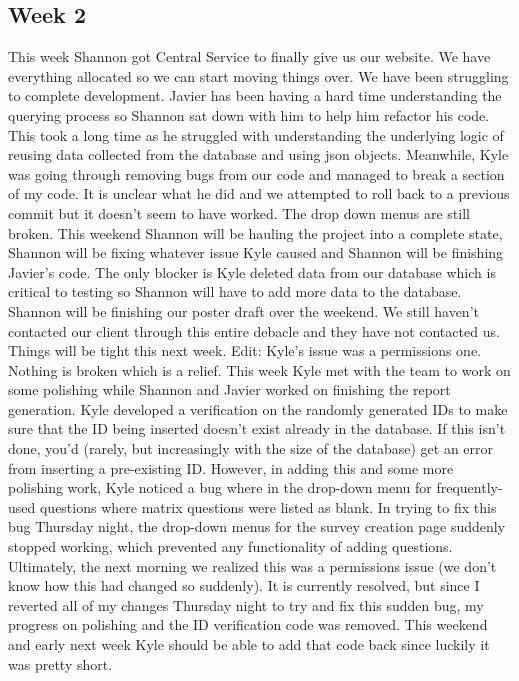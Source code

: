 \documentclass[letterpaper,10pt,serif,draftclsnofoot,onecolumn,compsoc,titlepage]{IEEEtran}
\begin{document}
\subsection{Week 2}
This week Shannon got Central Service to finally give us our website. We have everything
 allocated so we can start moving things over. We have been struggling to complete development.
 Javier has been having a hard time understanding the querying process so Shannon sat down with
 him to help him refactor his code. This took a long time as he struggled with understanding the
 underlying logic of reusing data collected from the database and using json objects. Meanwhile, Kyle
 was going through removing bugs from our code and managed to break a section of my code. It is unclear
 what he did and we attempted to roll back to a previous commit but it doesn't seem to have worked.
 The drop down menus are still broken. This weekend Shannon will be hauling the project into a complete state,
 Shannon will be fixing whatever issue Kyle caused and Shannon will be finishing Javier's code.
 The only blocker is Kyle deleted data from our database which is critical to testing so Shannon will
 have to add more data to the database. Shannon will be finishing our poster draft over the weekend.
 We still haven't contacted our client through this entire debacle and they have not contacted us.
 Things will be tight this next week. Edit: Kyle's issue was a permissions one. Nothing is broken
 which is a relief.
 This week Kyle met with the team to work on some polishing while Shannon and Javier worked on finishing
 the report generation. Kyle developed a verification on the randomly generated IDs to make sure that the
 ID being inserted doesn't exist already in the database. If this isn't done, you'd (rarely, but increasingly
 with the size of the database) get an error from inserting a pre-existing ID.
However, in adding this and some more polishing work, Kyle noticed a bug where in the drop-down menu for
 frequently-used questions where matrix questions were listed as blank. In trying to fix this bug Thursday night,
 the drop-down menus for the survey creation page suddenly stopped working, which prevented any functionality
 of adding questions. Ultimately, the next morning we realized this was a permissions issue (we don't know how 
 this had changed so suddenly). It is currently resolved, but since I reverted all of my changes Thursday night
 to try and fix this sudden bug, my progress on polishing and the ID verification code was removed.
This weekend and early next week Kyle should be able to add that code back since luckily it was pretty short.
\end{document}
